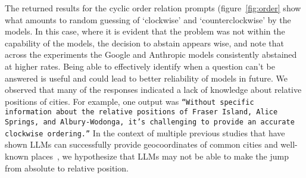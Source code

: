 The returned results for the cyclic order relation  prompts (figure~\ref{fig:order} show what amounts to random guessing of `clockwise' and `counterclockwise' by the models.
In this case, where it is evident that the problem was not within the capability of the models, the decision to abstain appears wise, and note that across the experiments the Google and Anthropic models consistently abstained at higher rates.
Being able to effectively identify when a question can't be answered is useful and could lead to better reliability of models in future. 
We observed that many of the responses indicated a lack of knowledge about relative positions of cities.
For example, one output was 
\texttt{``Without specific information about the relative positions of Fraser Island, Alice Springs, and Albury-Wodonga, it's challenging to provide an accurate clockwise ordering.''}
In the context of multiple previous studies that have shown LLMs can successfully provide geocoordinates of common cities and well-known places~\cite{Bhandari2023,Qi2023}, we hypothesize that LLMs may not be able to make the jump from absolute to relative position. 











